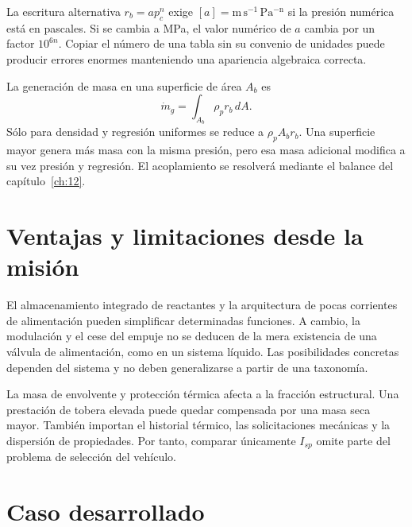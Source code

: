 La escritura alternativa $r_b=a p_c^n$ exige $[a]=\mathrm{m\,s^{-1}\,Pa^{-n}}$ si la presión numérica está en pascales. Si se cambia a MPa, el valor numérico de $a$ cambia por un factor $10^{6n}$. Copiar el número de una tabla sin su convenio de unidades puede producir errores enormes manteniendo una apariencia algebraica correcta.

La generación de masa en una superficie de área $A_b$ es
\begin{equation}\label{eq:massgeneration}
 \dot m_g=\int_{A_b}\rho_p r_b\,dA.
\end{equation}
Sólo para densidad y regresión uniformes se reduce a $\rho_pA_br_b$. Una superficie mayor genera más masa con la misma presión, pero esa masa adicional modifica a su vez presión y regresión. El acoplamiento se resolverá mediante el balance del capítulo~\ref{ch:12}.
\section{Ventajas y limitaciones desde la misión}
El almacenamiento integrado de reactantes y la arquitectura de pocas corrientes de alimentación pueden simplificar determinadas funciones. A cambio, la modulación y el cese del empuje no se deducen de la mera existencia de una válvula de alimentación, como en un sistema líquido. Las posibilidades concretas dependen del sistema y no deben generalizarse a partir de una taxonomía.

La masa de envolvente y protección térmica afecta a la fracción estructural. Una prestación de tobera elevada puede quedar compensada por una masa seca mayor. También importan el historial térmico, las solicitaciones mecánicas y la dispersión de propiedades. Por tanto, comparar únicamente $I_{sp}$ omite parte del problema de selección del vehículo.
\section{Caso desarrollado}

